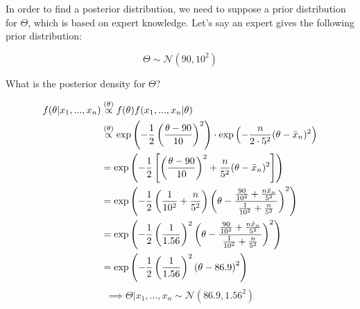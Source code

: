 \documentclass[a4paper]{article}
\begin{document}
                In order to find a posterior distribution, we need to suppose a
                prior distribution for $\Theta$, which is based on expert
                knowledge. Let's say an expert gives the following prior
                distribution:

                \[
                    \Theta \sim \mathcal{N}(90, 10^2)
                \]

                What is the posterior density for $\Theta$?

                \begin{align*}
                    f(\theta | x_1, ..., x_n) & \stackrel{({\theta})}{\propto} f(\theta)
                        f(x_1, ..., x_n | \theta) \\
                    & \stackrel{({\theta})}{\propto} \exp\left(-\frac{1}{2}\left(\frac{\theta
                        - 90}{10}\right)^2\right) \cdot \exp\left(-\frac{n}{2
                        \cdot 5^2}(\theta - \bar x_n)^2\right) \\
                    & = \exp\left(-\frac{1}{2}\left[\left(\frac{\theta - 90}{10}
                        \right)^2 + \frac{n}{5^2}(\theta - \bar x_n)^2\right]
                        \right)
                        \\
                    & = \exp\left(-\frac{1}{2}\left(\frac{1}{10^2} +
                        \frac{n}{5^2}\right)\left(\theta - \frac{\frac{90}{10^2}
                        + \frac{n \bar x_n}{5^2}}{\frac{1}{10^2} +
                        \frac{n}{5^2}}\right)^2\right) \\
                    & = \exp\left(-\frac{1}{2}\left(\frac{1}{1.56}\right)^2
                        \left(\theta - \frac{\frac{90}{10^2} + \frac{n \bar x_n}
                        {5^2}}{\frac{1}{10^2} + \frac{n}{5^2}}\right)^2\right)
                        \\
                    & = \exp\left(-\frac{1}{2}\left(\frac{1}{1.56}\right)^2
                        \left(\theta - 86.9\right)^2\right) \\
                \end{align*}
                \[
                    \implies \Theta | x_1, ..., x_n \sim \mathcal{N}(86.9,
                    1.56^2)
                \]
\end{document}
